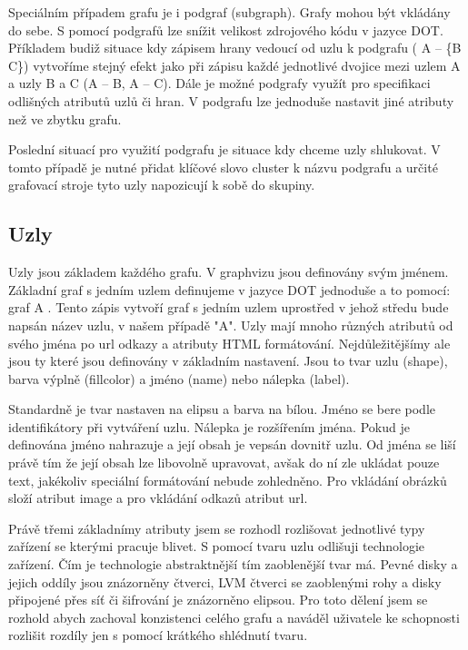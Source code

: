 \documentclass[color,table,oneside,nolot,nolof]{fithesis}
\begin{document}
	Speciálním případem grafu je i podgraf (subgraph). Grafy mohou být vkládány do sebe. S pomocí podgrafů lze snížit velikost zdrojového kódu v jazyce DOT. Příkladem budiž situace kdy zápisem
	hrany vedoucí od uzlu k podgrafu ( A -- \{B C\}) vytvoříme stejný efekt jako při zápisu každé jednotlivé dvojice mezi uzlem A a uzly B a C (A -- B, A -- C). Dále je možné podgrafy využít
	pro specifikaci odlišných atributů uzlů či hran. V podgrafu lze jednoduše nastavit jiné atributy než ve zbytku grafu.

	Poslední situací pro využití podgrafu je situace kdy chceme uzly shlukovat. V tomto případě je nutné přidat klíčové slovo cluster k názvu podgrafu a určité grafovací stroje tyto uzly 
	napozicují k sobě do skupiny.

\subsection{Uzly}
	Uzly jsou základem každého grafu. V graphvizu jsou definovány svým jménem. Základní graf s jedním uzlem definujeme v jazyce DOT jednoduše a to pomocí: graf { A }. Tento zápis vytvoří
	graf s jedním uzlem uprostřed v jehož středu bude napsán název uzlu, v našem případě "A". Uzly mají mnoho různých atributů od svého jména po url odkazy a atributy HTML formátování. 
	Nejdůležitějšímy ale jsou ty které jsou definovány v základním nastavení. Jsou to tvar uzlu (shape), barva výplně (fillcolor) a jméno (name) nebo nálepka (label). 
	
	Standardně je tvar nastaven na elipsu a barva
	na bílou. Jméno se bere podle identifikátory při vytváření uzlu. Nálepka je rozšířením jména. Pokud je definována jméno nahrazuje a její obsah je vepsán dovnitř uzlu. Od jména se liší právě
	tím že její obsah lze libovolně upravovat, avšak do ní zle ukládat pouze text, jakékoliv speciální formátování nebude zohledněno. Pro vkládání obrázků složí atribut image a pro vkládání
	odkazů atribut url.

	Právě třemi základnímy atributy jsem se rozhodl rozlišovat jednotlivé typy zařízení se kterými pracuje blivet. S pomocí tvaru uzlu odlišuji technologie zařízení. Čím je technologie
	abstraktnější tím zaoblenější tvar má. Pevné disky a jejich oddíly jsou znázorněny čtverci, LVM čtverci se zaoblenými rohy a disky připojené přes síť či šifrování je znázorněno elipsou.
	Pro toto dělení jsem se rozhold abych zachoval konzistenci celého grafu a naváděl uživatele ke schopnosti rozlišit rozdíly jen s pomocí krátkého shlédnutí tvaru.
\end{document}
